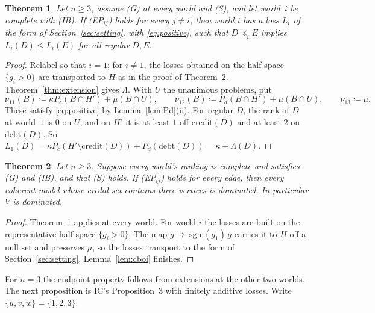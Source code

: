 \documentclass[11pt]{article}
\newtheorem{theorem}{Theorem}
\theoremstyle{definition}\newtheorem{definition}[theorem]{Definition}
\theoremstyle{remark}\newtheorem{remark}[theorem]{Remark}
\newcommand{\debt}{\mathrm{debt}}
\newcommand{\cred}{\mathrm{credit}}
\begin{document}
\begin{theorem}\label{thm:A}
Let $n\ge3$, assume (G) at every world and (S), and let world~$i$ be complete
with (IB). If (EP$_{ij}$) holds for every $j\ne i$, then world $i$ has a loss
$L_i$ of the form of Section~\ref{sec:setting}, with \eqref{eq:positive},
such that $D\preceq_iE$ implies $L_i(D)\le L_i(E)$ for all regular $D,E$.
\end{theorem}
\begin{proof}
Relabel so that $i=1$; for $i\ne1$, the losses obtained on the half-space
$\{g_i>0\}$ are transported to $H$ as in the proof of
Theorem~\ref{thm:reduction}. Theorem~\ref{thm:extension} gives $\Lambda$. With $U$
the unanimous problems, put
\[
 \nu_{11}(B)\coloneqq\kappa P_c(B\cap H')+\mu(B\cap U),\qquad
 \nu_{12}(B)\coloneqq P_d(B\cap H')+\mu(B\cap U),\qquad
 \nu_{13}\coloneqq\mu.
\]
These satisfy \eqref{eq:positive} by Lemma~\ref{lem:Pd}(ii). For regular $D$,
the rank of $D$ at world~$1$ is $0$ on $U$, and on $H'$ it is at least $1$ off
$\cred(D)$ and at least $2$ on $\debt(D)$. So
$L_1(D)=\kappa P_c(H'\setminus\cred(D))+P_d(\debt(D))=\kappa+\Lambda(D)$.
\end{proof}

\begin{theorem}\label{thm:reduction}
Let $n\ge3$. Suppose every world's ranking is complete and satisfies (G) and
(IB), and that (S) holds. If (EP$_{ij}$) holds for every edge, then every
coherent model whose credal set contains three vertices is dominated. In
particular $V$ is dominated.
\end{theorem}
\begin{proof}
Theorem~\ref{thm:A} applies at every world. For world $i$ the losses are
built on the representative half-space $\{g_i>0\}$. The map
$g\mapsto\operatorname{sgn}(g_1)\,g$ carries it to $H$ off a null set and
preserves $\mu$, so the losses transport to the form of
Section~\ref{sec:setting}. Lemma~\ref{lem:cboi} finishes.
\end{proof}

For $n=3$ the endpoint property follows from extensions at the other two
worlds. The next proposition is IC's Proposition~3 with finitely additive
losses. Write $\{u,v,w\}=\{1,2,3\}$.
\end{document}
